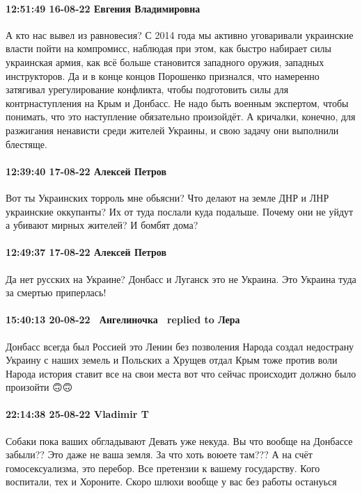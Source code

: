  
 
 
 
 

\paragraph{12:51:49 16-08-22 Евгения Владимировна}

А кто нас вывел из равновесия? С 2014 года мы активно уговаривали украинские
власти пойти на компромисс, наблюдая при этом, как быстро набирает силы
украинская армия, как всё больше становится западного оружия, западных
инструкторов. Да и в конце концов Порошенко признался, что намеренно затягивал
урегулирование конфликта, чтобы подготовить силы для контрнаступления на Крым и
Донбасс. Не надо быть военным экспертом, чтобы понимать, что это наступление
обязательно произойдёт. А кричалки, конечно, для разжигания ненависти среди
жителей Украины, и свою задачу они выполнили блестяще.

\paragraph{12:39:40 17-08-22 Алексей Петров}

Вот ты Украинских торроль мне обьясни? Что делают на земле ДНР и ЛНР украинские
оккупанты? Их от туда послали куда подальше. Почему они не уйдут а убивают
мирных жителей? И бомбят дома?

\paragraph{12:49:37 17-08-22 Алексей Петров}

Да нет русских на Украине? Донбасс и Луганск это не Украина. Это Украина туда
за смертью приперлась!

\paragraph{15:40:13 20-08-22 🧚‍♀️Ангелиночка 🧚‍♀️replied to Лера}

Донбасс всегда был Россией это Ленин без позволения Народа создал недострану
Украину с наших земель и Польских а Хрущев отдал Крым тоже против воли Народа
история ставит все на свои места вот что сейчас происходит должно было
произойти 🙃🙃


\paragraph{22:14:38 25-08-22 Vladimir T}

Собаки пока ваших обгладывают
Девать уже некуда.
Вы что вообще на Донбассе забыли??
Это даже не ваша земля.
За что хоть воюете там???
А на счёт гомосексуализма, это перебор.
Все претензии к вашему государству.
Кого воспитали, тех и Хороните.
Скоро шлюхи вообще у вас без работы остануься🤣🤣🤣🤣


